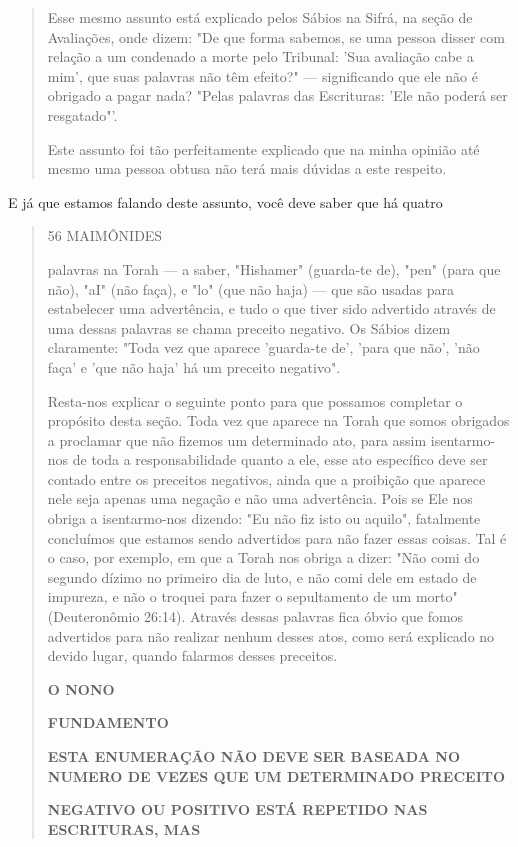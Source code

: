 \begin{quote}
Esse mesmo assunto está explicado pelos Sábios na Sifrá, na seção de
Avaliações, onde dizem: "De que forma sabemos, se uma pessoa disser com
relação a um condenado a morte pelo Tribunal: 'Sua avaliação cabe a
mim', que suas palavras não têm efeito?" --- significando que ele não é
obrigado a pagar nada? "Pelas palavras das Escrituras: 'Ele não poderá
ser resgatado"'.

Este assunto foi tão perfeitamente explicado que na minha opinião até
mesmo uma pessoa obtusa não terá mais dúvidas a este respeito.
\end{quote}

E já que estamos falando deste assunto, você deve saber que há quatro

\begin{quote}
56 MAIMÔNIDES

palavras na Torah --- a saber, "Hishamer" (guarda-te de), "pen" (para
que não), "aI" (não faça), e "lo" (que não haja) --- que são usadas para
estabelecer uma ad­vertência, e tudo o que tiver sido advertido através
de uma dessas palavras se cha­ma preceito negativo. Os Sábios dizem
claramente: "Toda vez que aparece 'guar­da-te de', 'para que não', 'não
faça' e 'que não haja' há um preceito negativo".

Resta-nos explicar o seguinte ponto para que possamos completar o
propósito desta seção. Toda vez que aparece na Torah que somos obrigados
a proclamar que não fizemos um determinado ato, para assim isentarmo-nos
de toda a responsabilidade quanto a ele, esse ato específico deve ser
contado entre os preceitos negativos, ainda que a proibição que aparece
nele seja ape­nas uma negação e não uma advertência. Pois se Ele nos
obriga a isentarmo-nos dizendo: "Eu não fiz isto ou aquilo", fatalmente
concluímos que estamos sen­do advertidos para não fazer essas coisas.
Tal é o caso, por exemplo, em que a Torah nos obriga a dizer: "Não comi
do segundo dízimo no primeiro dia de luto, e não comi dele em estado de
impureza, e não o troquei para fazer o se­pultamento de um morto"
(Deuteronômio 26:14). Através dessas palavras fica óbvio que fomos
advertidos para não realizar nenhum desses atos, como será explicado no
devido lugar, quando falarmos desses preceitos.

\textbf{O NONO}

\textbf{FUNDAMENTO}

\textbf{ESTA ENUMERAÇÃO NÃO DEVE SER BASEADA NO NUMERO DE VEZES QUE UM
DETERMINADO PRECEITO}

\textbf{NEGATIVO OU POSITIVO ESTÁ REPETIDO NAS ESCRITURAS, MAS}


\end{quote}
